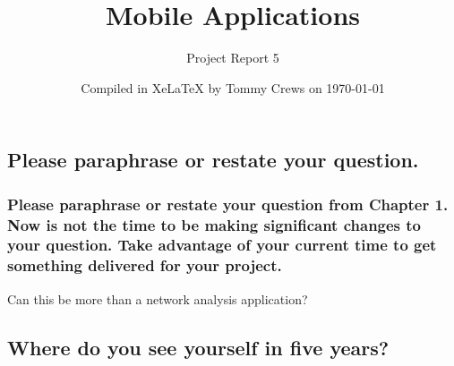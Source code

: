 \documentclass[letterpaper]{article}            %
\title{Mobile Applications}                     %
\author{Project Report 5}                       %
\date{Compiled in Xe\LaTeX{} by Tommy Crews on \today}         %
\begin{document}
\newcommand{\code}[1]{\texttt{#1}}              %

\setcounter{section}{5}							%

\maketitle                                      %



%
%




\subsection{Please paraphrase or restate your question.}

\subsubsection{Please paraphrase or restate your question from Chapter 1. Now is not the time to be making significant changes to your question. Take advantage of your current time to get something delivered for your project.}

Can this be more than a network analysis application?


\subsection{Where do you see yourself in five years?}
\end{document}
